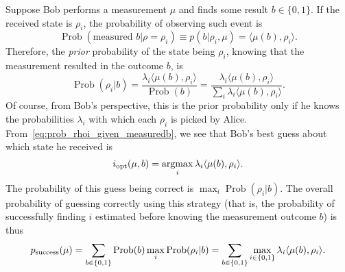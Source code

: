 \documentclass[12pt]{report}
\DeclareMathOperator{\Prob}{Prob}
\DeclareMathOperator*{\argmax}{argmax}
\begin{document}
Suppose Bob performs a measurement $\mu$ and finds some result $b\in\{0,1\}$.
If the received state is $\rho_i$, the probability of observing such event is
\begin{equation}
	\Prob(\text{measured }b | \rho=\rho_i)
	\equiv p(b | \rho_i,\mu)
	= \langle \mu(b), \rho_i\rangle.
\end{equation}
Therefore, the \emph{prior} probability of the state being $\rho_i$, knowing that the measurement resulted in the outcome $b$, is
\begin{equation}
	\Prob(\rho_i | b)
	= \frac{\lambda_i \langle \mu(b),\rho_i\rangle}{\Prob(b)}
	= \frac{\lambda_i \langle \mu(b),\rho_i\rangle}{\sum_i \lambda_i \langle \mu(b),\rho_i\rangle}.
	\label{eq:prob_rhoi_given_measuredb}
\end{equation}
Of course, from Bob's perspective, this is the prior probability only if he knows the probabilities $\lambda_i$ with which each $\rho_i$ is picked by Alice.
From~\cref{eq:prob_rhoi_given_measuredb}, we see that Bob's best guess about which state he received is
\begin{equation}
	i_{\rm opt}(\mu,b) = \argmax_i \lambda_i \langle\mu(b),\rho_i\rangle.
\end{equation}
The probability of this guess being correct is
$\max_i\Prob(\rho_i|b)$.
The overall probability of guessing correctly using this strategy (that is, the probability of successfully finding $i$ estimated before knowing the measurement outcome $b$) is thus
\begin{equation}
	p_{\rm success}(\mu)
	= \sum_{b\in\{0,1\}}
	\Prob(b)
	\max_i \Prob(\rho_i | b)
	= \sum_{b\in\{0,1\}}
	\max_{i\in\{0,1\}}
	\lambda_i \langle\mu(b),\rho_i\rangle.
\end{equation}
\end{document}
